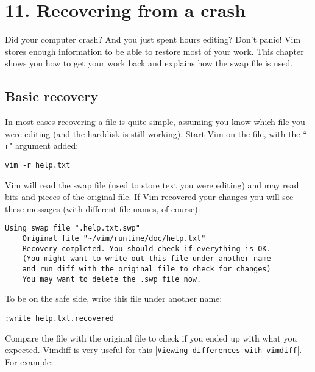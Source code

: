 \section{11. Recovering from a crash}
Did your computer crash?  And you just spent hours editing?  Don't panic!  Vim
stores enough information to be able to restore most of your work.  This
chapter shows you how to get your work back and explains how the swap file is
used.
\localtableofcontents
\subsection{Basic recovery}
In most cases recovering a file is quite simple, assuming you know which file you were editing (and the harddisk is still working).
Start Vim on the file, with the ``\texttt{-r}" argument added:

\begin{Verbatim}[samepage=true]
 vim -r help.txt
\end{Verbatim}

Vim will read the swap file (used to store text you were editing) and may read bits and pieces of the original file.
If Vim recovered your changes you will see these messages (with different file names, of course):

\begin{Verbatim}[samepage=true]
    Using swap file ".help.txt.swp"
    Original file "~/vim/runtime/doc/help.txt"
    Recovery completed. You should check if everything is OK.
    (You might want to write out this file under another name
    and run diff with the original file to check for changes)
    You may want to delete the .swp file now.
\end{Verbatim}

To be on the safe side, write this file under another name:

\begin{Verbatim}[samepage=true]
 :write help.txt.recovered
\end{Verbatim}

Compare the file with the original file to check if you ended up with what you expected.
Vimdiff is very useful for this |\hyperref[Viewing differences with vimdiff]{\texttt{Viewing differences with vimdiff}}|.
For example:

